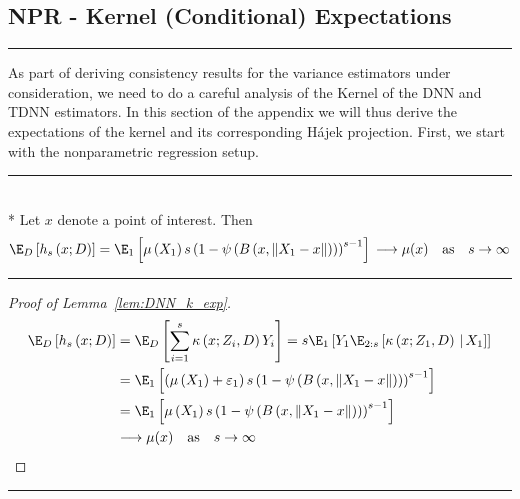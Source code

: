 \newpage
\subsection{NPR - Kernel (Conditional) Expectations}\label{subsec:KernelCondExp}
\hrule
As part of deriving consistency results for the variance estimators under consideration, we need to do a careful analysis of the Kernel of the DNN and TDNN estimators.
In this section of the appendix we will thus derive the expectations of the kernel and its corresponding H\'ajek projection.
First, we start with the nonparametric regression setup.
\vspace{0.5cm}
\hrule

\begin{lem}\label{lem:DNN_k_exp}\mbox{}\\*
	Let $x$ denote a point of interest.
	Then
	\begin{equation}
		\E_D\left[h_s\left(x; D\right)\right]
		= \E_{1}\left[\mu\left(X_1\right) s\left(1 - \psi\left(B\left(x, \|X_1 - x\|\right)\right)\right)^{s-1}\right]\\
		\longrightarrow \mu(x) \quad \text{as} \quad s \rightarrow \infty
	\end{equation}
\end{lem}
\hrule
\begin{proof}[Proof of Lemma~\ref{lem:DNN_k_exp}]
	\begin{equation}
		\begin{aligned}
			\E_D\left[h_s\left(x; D\right)\right]
			 & = \E_D\left[\sum_{i = 1}^{s} \kappa\left(x; Z_{i}, D\right) Y_{i}\right]
			= s \E_{1}\left[Y_1 \E_{2:s}\left[\kappa\left(x; Z_1, D\right)\, | \, X_1 \right]\right]                                                                \\
			 & = \E_{1}\left[\left(\mu\left(X_1\right) + \varepsilon_1\right) s\left(1 - \psi\left(B\left(x, \|X_1 - x\|\right)\right)\right)^{s-1}\right] \\
			 & = \E_{1}\left[\mu\left(X_1\right) s\left(1 - \psi\left(B\left(x, \|X_1 - x\|\right)\right)\right)^{s-1}\right]                              \\
			 & \longrightarrow \mu(x) \quad \text{as} \quad s \rightarrow \infty
		\end{aligned}
	\end{equation}
\end{proof}

\hrule

